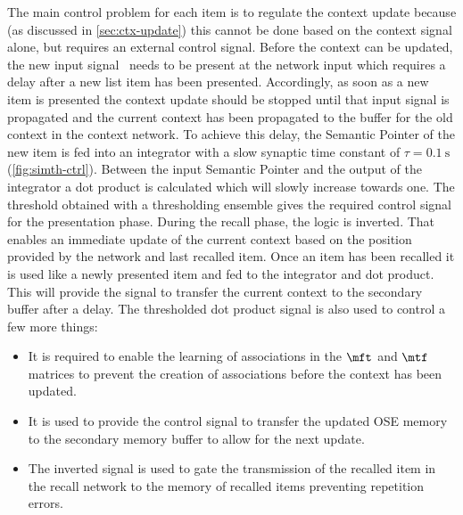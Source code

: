 The main control problem for each item is to regulate the context update because (as discussed in \cref{sec:ctx-update}) this cannot be done based on the context signal alone, but requires an external control signal.
Before the context can be updated, the new input signal \ctxin\ needs to be present at the network input which requires a delay after a new list item has been presented.
Accordingly, as soon as a new item is presented the context update should be stopped until that input signal is propagated and the current context has been propagated to the buffer for the old context in the context network.
To achieve this delay, the Semantic Pointer of the new item is fed into an integrator with a slow synaptic time constant of $\tau = \SI{0.1}{\second}$ (\cref{fig:simth-ctrl}).
Between the input Semantic Pointer and the output of the integrator a dot product is calculated which will slowly increase towards one.
The threshold obtained with a thresholding ensemble gives the required control signal for the presentation phase.
During the recall phase, the logic is inverted.
That enables an immediate update of the current context based on the position provided by the  network and last recalled item.
Once an item has been recalled it is used like a newly presented item and fed to the integrator and dot product.
This will provide the signal to transfer the current context to the secondary buffer after a delay.
The thresholded dot product signal is also used to control a few more things:
\begin{itemize}
    \item It is required to enable the learning of associations in the $\mft$ and $\mtf$ matrices to prevent the creation of associations before the context has been updated.
    \item It is used to provide the control signal to transfer the updated OSE memory to the secondary memory buffer to allow for the next update.
    \item The inverted signal is used to gate the transmission of the recalled item in the recall network to the memory of recalled items preventing repetition errors.
\end{itemize}
